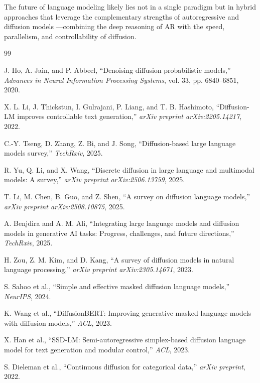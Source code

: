 \documentclass[11pt]{article}
\begin{document}
The future of language modeling likely lies not in a single paradigm but in hybrid approaches that leverage the complementary strengths of autoregressive and diffusion models \cite{benjdira2025integrating}---combining the deep reasoning of AR with the speed, parallelism, and controllability of diffusion.


\begin{thebibliography}{99}

J. Ho, A. Jain, and P. Abbeel, ``Denoising diffusion probabilistic models,'' \textit{Advances in Neural Information Processing Systems}, vol. 33, pp. 6840--6851, 2020.

X. L. Li, J. Thickstun, I. Gulrajani, P. Liang, and T. B. Hashimoto, ``Diffusion-LM improves controllable text generation,'' \textit{arXiv preprint arXiv:2205.14217}, 2022.

C.-Y. Tseng, D. Zhang, Z. Bi, and J. Song, ``Diffusion-based large language models survey,'' \textit{TechRxiv}, 2025.

R. Yu, Q. Li, and X. Wang, ``Discrete diffusion in large language and multimodal models: A survey,'' \textit{arXiv preprint arXiv:2506.13759}, 2025.

T. Li, M. Chen, B. Guo, and Z. Shen, ``A survey on diffusion language models,'' \textit{arXiv preprint arXiv:2508.10875}, 2025.

A. Benjdira and A. M. Ali, ``Integrating large language models and diffusion models in generative AI tasks: Progress, challenges, and future directions,'' \textit{TechRxiv}, 2025.

H. Zou, Z. M. Kim, and D. Kang, ``A survey of diffusion models in natural language processing,'' \textit{arXiv preprint arXiv:2305.14671}, 2023.

S. Sahoo et al., ``Simple and effective masked diffusion language models,'' \textit{NeurIPS}, 2024.

K. Wang et al., ``DiffusionBERT: Improving generative masked language models with diffusion models,'' \textit{ACL}, 2023.

X. Han et al., ``SSD-LM: Semi-autoregressive simplex-based diffusion language model for text generation and modular control,'' \textit{ACL}, 2023.

S. Dieleman et al., ``Continuous diffusion for categorical data,'' \textit{arXiv preprint}, 2022.


\end{thebibliography}
\end{document}
